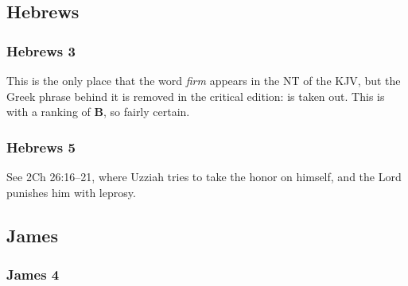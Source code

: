 \subsection{Hebrews} %

	\subsubsection{Hebrews 3} %

		\begin{compactitem}

		\item[6$\vert$]
		\begin{compactdesc}
		\item[firm] This is the only place that the word \textit{firm} appears in the NT of the KJV, but the Greek phrase behind it is removed in the critical edition:  is taken out. This is with a ranking of \textbf{B}, so fairly certain.
		\end{compactdesc}

		\end{compactitem}
		
	\subsubsection{Hebrews 5} %
	
		\begin{compactdesc}
		
		\item[4$\vert$]
		\begin{compactdesc}
		\item[no man...but he that is called of God] See 2Ch 26:16--21, where Uzziah tries to take the honor on himself, and the Lord punishes him with leprosy.
		\end{compactdesc}
		
		\end{compactdesc}
		
\subsection{James} %

	\subsubsection{James 4} %
	
